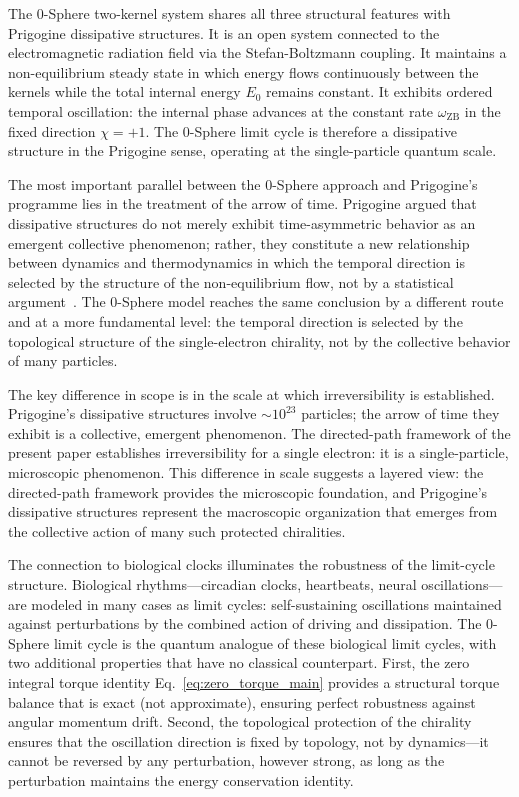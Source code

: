\documentclass[%
 reprint, amsmath,amssymb, aps, prb, ]{revtex4-2}
\numberwithin{equation}{section}
\newcommand{\omZB}{\omega_{\text{ZB}}}
\begin{document}
The 0-Sphere two-kernel system shares all three structural features with Prigogine dissipative structures. It is an open system connected to the electromagnetic radiation field via the Stefan-Boltzmann coupling. It maintains a non-equilibrium steady state in which energy flows continuously between the kernels while the total internal energy $E_0$ remains constant. It exhibits ordered temporal oscillation: the internal phase advances at the constant rate $\omZB$ in the fixed direction $\chi = +1$. The 0-Sphere limit cycle is therefore a dissipative structure in the Prigogine sense, operating at the single-particle quantum scale.

The most important parallel between the 0-Sphere approach and Prigogine's programme lies in the treatment of the arrow of time. Prigogine argued that dissipative structures do not merely exhibit time-asymmetric behavior as an emergent collective phenomenon; rather, they constitute a new relationship between dynamics and thermodynamics in which the temporal direction is selected by the structure of the non-equilibrium flow, not by a statistical argument~\cite{Prigogine1984, Lebowitz1993}. The 0-Sphere model reaches the same conclusion by a different route and at a more fundamental level: the temporal direction is selected by the topological structure of the single-electron chirality, not by the collective behavior of many particles.

The key difference in scope is in the scale at which irreversibility is established. Prigogine's dissipative structures involve $\sim 10^{23}$ particles; the arrow of time they exhibit is a collective, emergent phenomenon. The directed-path framework of the present paper establishes irreversibility for a single electron: it is a single-particle, microscopic phenomenon. This difference in scale suggests a layered view: the directed-path framework provides the microscopic foundation, and Prigogine's dissipative structures represent the macroscopic organization that emerges from the collective action of many such protected chiralities.

The connection to biological clocks illuminates the robustness of the limit-cycle structure. Biological rhythms---circadian clocks, heartbeats, neural oscillations---are modeled in many cases as limit cycles: self-sustaining oscillations maintained against perturbations by the combined action of driving and dissipation. The 0-Sphere limit cycle is the quantum analogue of these biological limit cycles, with two additional properties that have no classical counterpart. First, the zero integral torque identity Eq.~\eqref{eq:zero_torque_main} provides a structural torque balance that is exact (not approximate), ensuring perfect robustness against angular momentum drift. Second, the topological protection of the chirality ensures that the oscillation direction is fixed by topology, not by dynamics---it cannot be reversed by any perturbation, however strong, as long as the perturbation maintains the energy conservation identity.
\end{document}
